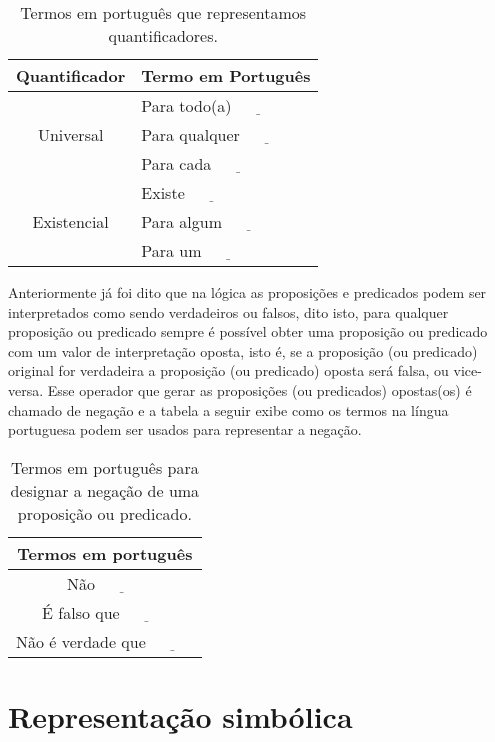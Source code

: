\begin{table}[h]
	\centering
	\scriptsize
	\label{tab:QuantificadoresPT-BR}
	\begin{tabular}{cl}
		\hline
		\textbf{Quantificador}  & \textbf{Termo em Portugu\^es} \\ \hline
		\multirow{3}{*}{Universal}    & Para todo(a) $\underline{ \ \ \ \ \ \ \ \ \ \ \ \ }$\\
		& Para qualquer $\underline{ \ \ \ \ \ \ \ \ \ \ \ \ }$\\
		& Para cada $\underline{ \ \ \ \ \ \ \ \ \ \ \ \ }$\\ \hline
		\multirow{3}{*}{Existencial} & Existe $\underline{ \ \ \ \ \ \ \ \ \ \ \ \ }$\\
		& Para algum $\underline{ \ \ \ \ \ \ \ \ \ \ \ \ }$\\
		& Para um $\underline{ \ \ \ \ \ \ \ \ \ \ \ \ }$\\ \hline
	\end{tabular}
	\caption{Termos em português que representamos quantificadores.}
\end{table}

Anteriormente já foi dito que na lógica as proposições e predicados podem ser interpretados como sendo verdadeiros ou falsos, dito isto, para qualquer proposição ou predicado sempre é possível obter uma proposição ou predicado com um valor de interpretação oposta, isto é, se a proposição (ou predicado) original for verdadeira a proposição (ou predicado) oposta será falsa, ou vice-versa. Esse operador que gerar as proposições (ou predicados) opostas(os) é chamado de negação e a tabela a seguir exibe como os termos na língua portuguesa podem ser usados para representar a negação.

\begin{table}[h]
	\label{tab:NegacaoPortugues}
	\scriptsize
	\centering
	\begin{tabular}{c}
		\hline
		Termos em português\\
		\hline
		Não $\underline{ \ \ \ \ \ \ \ \ \ \ \ \ }$ \\
		É falso que $\underline{ \ \ \ \ \ \ \ \ \ \ \ \ }$\\
		Não é verdade que $\underline{ \ \ \ \ \ \ \ \ \ \ \ \ }$ \\ \hline
	\end{tabular}
	\caption{Termos em português para designar a negação de uma proposição ou predicado.}
\end{table}

\section{Representação simbólica}\label{sec:Representacao-simbolica}

